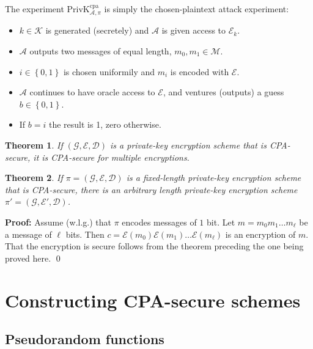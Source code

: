 \documentclass[a4paper, 12pt]{article}
\newtheorem{theorem}{Theorem}
\newtheorem{theorem}{Theorem}
\newenvironment{proof}[1][Proof]{\par\small\noindent\textbf{#1:} }{\qed\par\normalsize}
\begin{document}
The experiment PrivK$_{\mathcal{A}, \pi}^{\text{cpa}}$ is simply the 
chosen-plaintext attack experiment: 

\begin{itemize}
    \item $k \in \mathcal{K}$ is generated (secretely) and $\mathcal{A}$ is given 
        access to $\mathcal{E}_k$.
    \item $\mathcal{A}$ outputs two messages of equal length, $m_0, m_1 \in \mathcal{M}$.
    \item $i \in \left\{ 0, 1 \right\} $ is chosen uniformily and 
        $m_i$ is encoded with $\mathcal{E}$.
    \item $\mathcal{A}$ continues to have oracle access to $\mathcal{E}$,
    and ventures (outputs) a guess $b \in \left\{ 0, 1 \right\} $.

    \item If $ b = i$ the result is 1, zero otherwise.

\end{itemize}


\begin{theorem}
    If $(\mathcal{G}, \mathcal{E}, \mathcal{D})$ is a private-key encryption 
    scheme that is CPA-secure, it is CPA-secure for 
    multiple encryptions.
\end{theorem}

\begin{theorem}
    If $\pi = (\mathcal{G}, \mathcal{E}, \mathcal{D})$ is a 
    fixed-length private-key encryption scheme that is CPA-secure, there is an arbitrary length
    private-key encryption scheme $\pi' = (\mathcal{G}, \mathcal{E}', \mathcal{D})$.
\end{theorem}

\begin{proof}
    Assume (w.l.g.) that $\pi$ encodes messages of $1$ bit. Let 
    $m = m_0 m_1 \ldots m_\ell$  be a message of $\ell$ bits.
    Then $c = \mathcal{E}(m_0)\mathcal{E}(m_1)\ldots\mathcal{E}(m_\ell)$ 
    is an encryption of $m$. That the encryption is secure follows 
    from the theorem preceding the one being proved here.
\end{proof}

\section{Constructing CPA-secure schemes}

\subsection{Pseudorandom functions}
\end{document}
